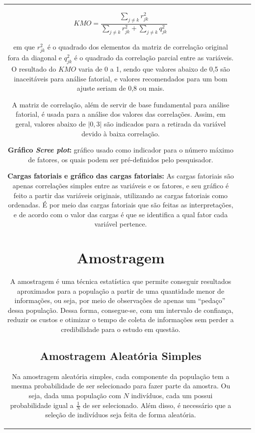 \documentclass[
]{estat/estat}
\begin{document}
\begin{tabular}{c|cc}
\[
KMO = \frac{\sum_{j \neq k} r_{jk}^2}{\sum_{j \neq k} r_{jk}^2 + \sum_{j \neq k} q_{jk}^2}
\]

em que \(r_{jk}^2\) é o quadrado dos elementos da matriz de correlação
original fora da diagonal e \(q_{jk}^2\) é o quadrado da correlação
parcial entre as variáveis. O resultado do \(KMO\) varia de 0 a 1, sendo
que valores abaixo de 0,5 são inaceitáveis para análise fatorial, e
valores recomendados para um bom ajuste seriam de 0,8 ou mais.

A matriz de correlação, além de servir de base fundamental para análise
fatorial, é usada para a análise dos valores das correlações. Assim, em
geral, valores abaixo de \(|0,3|\) são indicados para a retirada da
variável devido à baixa correlação.

\textbf{Gráfico \emph{Scree plot}:} gráfico usado como indicador para o
número máximo de fatores, os quais podem ser pré-definidos pelo
pesquisador.

\textbf{Cargas fatoriais e gráfico das cargas fatoriais:} As cargas
fatoriais são apenas correlações simples entre as variáveis e os
fatores, e seu gráfico é feito a partir das variáveis originais,
utilizando as cargas fatoriais como ordenadas. É por meio das cargas
fatoriais que são feitas as interpretações, e de acordo com o valor das
cargas é que se identifica a qual fator cada variável pertence.

\hypertarget{amostragem}{%
\section{Amostragem}\label{amostragem}}

A amostragem é uma técnica estatística que permite conseguir resultados
aproximados para a população a partir de uma quantidade menor de
informações, ou seja, por meio de observações de apenas um
``pedaço''\(\:\)dessa população. Dessa forma, consegue-se, com um
intervalo de confiança, reduzir os custos e otimizar o tempo de coleta
de informações sem perder a credibilidade para o estudo em questão.

\hypertarget{amostragem-aleatuxf3ria-simples}{%
\subsection{Amostragem Aleatória
Simples}\label{amostragem-aleatuxf3ria-simples}}

Na amostragem aleatória simples, cada componente da população tem a
mesma probabilidade de ser selecionado para fazer parte da amostra. Ou
seja, dada uma população com \(N\) indivíduos, cada um possui
probabilidade igual a \(\frac{1}{N}\) de ser selecionado. Além disso, é
necessário que a seleção de indivíduos seja feita de forma aleatória.


\end{tabular}
\end{document}
